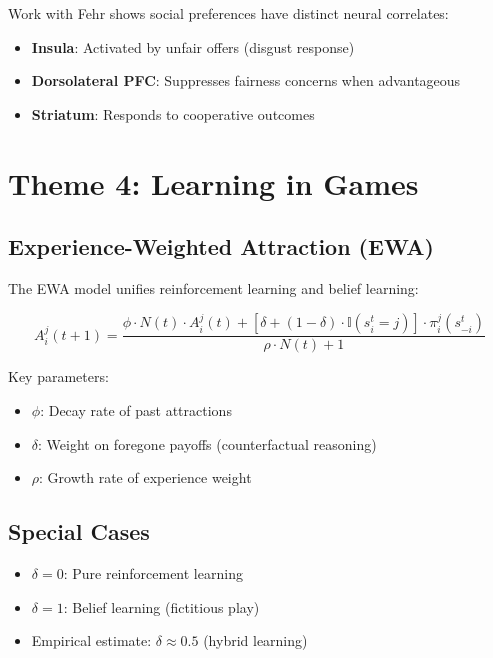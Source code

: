 Work with Fehr \citep{fehr2007neurobiology} shows social preferences have distinct neural correlates:
\begin{itemize}[nosep]
\item \textbf{Insula}: Activated by unfair offers (disgust response)
\item \textbf{Dorsolateral PFC}: Suppresses fairness concerns when advantageous
\item \textbf{Striatum}: Responds to cooperative outcomes
\end{itemize}


\section{Theme 4: Learning in Games}
\label{sec:ca-learning}

\subsection{Experience-Weighted Attraction (EWA)}

The EWA model \citep{camerer2005frame} unifies reinforcement learning and belief learning:

\begin{equation}
A_i^j(t+1) = \frac{\phi \cdot N(t) \cdot A_i^j(t) + [\delta + (1-\delta) \cdot \mathbb{I}(s_i^t = j)] \cdot \pi_i^j(s_{-i}^t)}{\rho \cdot N(t) + 1}
\end{equation}

Key parameters:
\begin{itemize}[nosep]
\item $\phi$: Decay rate of past attractions
\item $\delta$: Weight on foregone payoffs (counterfactual reasoning)
\item $\rho$: Growth rate of experience weight
\end{itemize}

\subsection{Special Cases}

\begin{itemize}[nosep]
\item $\delta = 0$: Pure reinforcement learning
\item $\delta = 1$: Belief learning (fictitious play)
\item Empirical estimate: $\delta \approx 0.5$ (hybrid learning)
\end{itemize}


